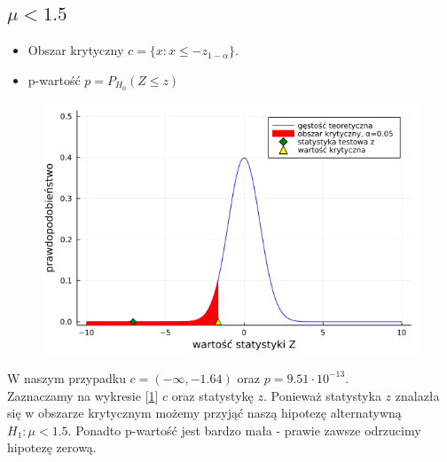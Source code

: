\documentclass{article}
\theoremstyle{break}
\begin{document}
\subsection*{$\mu < 1.5$}
\begin{itemize}
	\item Obszar krytyczny $c=\{x: x\leq -z_{1-\alpha}\}$.
	\item p-wartość $p=P_{H_0}(Z\leq z)$
\end{itemize}
\begin{figure}[H]
	\begin{center}
		\includegraphics[scale=0.5]{Z1.3.png}
		\caption{}
		\label{fig:3}
	\end{center}
\end{figure}
W naszym przypadku $c=(-\infty,-1.64)$ oraz $p=9.51\cdot 10^{-13}$.\\
Zaznaczamy na wykresie [\ref{fig:3}]  $c$ oraz statystykę $z$. Ponieważ statystyka $z$ znalazła się w obszarze krytycznym możemy przyjąć naszą hipotezę alternatywną $H_1: \mu < 1.5$. Ponadto p-wartość jest bardzo mała - prawie zawsze odrzucimy hipotezę zerową.\\ \\
\end{document}
